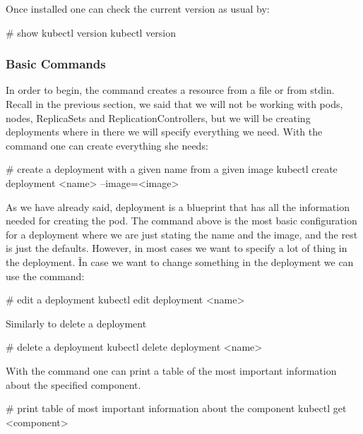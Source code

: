 Once installed one can check the current version as usual by:

\begin{bash}
# show kubectl version
kubectl version
\end{bash}

\subsubsection{Basic Commands}

In order to begin, the  command creates a resource from a file or from stdin. Recall in the
previous section, we said that we will not be working with pods, nodes, ReplicaSets and ReplicationControllers, but
we will be creating deployments where in there we will specify everything we need. With the  command one can create everything she needs:

\begin{bash}
# create a deployment with a given name from a given image
kubectl create deployment <name> --image=<image>
\end{bash}

As we have already said, deployment is a blueprint that has all the information needed for creating the pod. The
command above is the most basic configuration for a deployment where we are just stating the name and the image, and
the rest is just the defaults. However, in most cases we want to specify a lot of thing in the deployment. \v

In case we want to change something in the deployment we can use the  command:

\begin{bash}
# edit a deployment
kubectl edit deployment <name>
\end{bash}

Similarly to delete a deployment

\begin{bash}
# delete a deployment
kubectl delete deployment <name>
\end{bash}

With the  command one can print a table of the most important information about the specified
component.

\begin{bash}
# print table of most important information about the component
kubectl get <component>
\end{bash}

